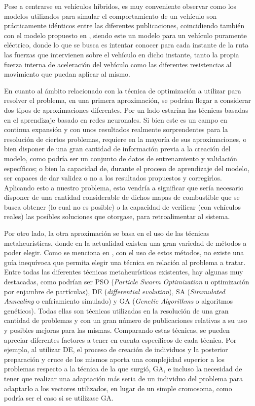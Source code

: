 \documentclass[11pt,spanish,listoffigures,listoftables]{tfgetsinf}
\begin{document}
Pese a centrarse en vehículos híbridos, es muy conveniente observar como los modelos utilizados para simular el comportamiento de un vehículo son prácticamente idénticos entre las diferentes publicaciones, coincidiendo también con el modelo propuesto en \cite{FIORI2016257}, siendo este un modelo para un vehículo puramente eléctrico, donde lo que se busca es intentar conocer para cada instante de la ruta las fuerzas que intervienen sobre el vehículo en dicho instante, tanto la propia fuerza interna de aceleración del vehículo como las diferentes resistencias al movimiento que puedan aplicar al mismo.

En cuanto al ámbito relacionado con la técnica de optimización a utilizar para resolver el problema, en una primera aproximación, se podrían llegar a considerar dos tipos de aproximaciones diferentes. Por un lado estarían las técnicas basadas en el aprendizaje basado en redes neuronales. Si bien este es un campo en continua expansión y con unos resultados realmente sorprendentes para la resolución de ciertos problemas, requiere en la mayoría de sus aproximaciones, o bien disponer de una gran cantidad de información previa a la creación del modelo, como podría ser un conjunto de datos de entrenamiento y validación específicos; o bien la capacidad de, durante el proceso de aprendizaje del modelo, ser capaces de dar validez o no a los resultados propuestos y corregirlos. Aplicando esto a nuestro problema, esto vendría a significar que sería necesario disponer de una cantidad considerable de dichos mapas de combustible que se busca obtener (lo cual no es posible) o la capacidad de verificar (con vehículos reales) las posibles soluciones que otorgase, para retroalimentar al sistema.

Por otro lado, la otra aproximación se basa en el uso de las técnicas metaheurísticas, donde en la actualidad existen una gran variedad de métodos a poder elegir. Como se menciona en \cite{DOKEROGLU2019106040}, con el uso de estos métodos, no existe una guía inequívoca que permita elegir una técnica en relación al problema a tratar. Entre todas las diferentes técnicas metaheurísticas existentes, hay algunas muy destacadas, como podrían ser PSO (\textit{Particle Swarm Optimization} u optimización por enjambre de partículas), DE (\textit{differential evolution}), SA (\textit{Simmulated Annealing} o enfriamiento simulado) y GA (\textit{Genetic Algorithms} o algoritmos genéticos). Todas ellas son técnicas utilizadas en la resolución de una gran cantidad de problemas y con un gran número de publicaciones relativas a su uso y posibles mejoras para las mismas. Comparando estas técnicas, se pueden apreciar diferentes factores a tener en cuenta específicos de cada técnica. Por ejemplo, al utilizar DE, el proceso de creación de individuos y la posterior preparación y cruce de los mismos aporta una complejidad superior a los problemas respecto a la técnica de la que surgió, GA, e incluso la necesidad de tener que realizar una adaptación más seria de un individuo del problema para adaptarlo a los vectores utilizados, en lugar de un simple cromosoma, como podría ser el caso si se utilizase GA\cite{KACHI2012}.
\end{document}
